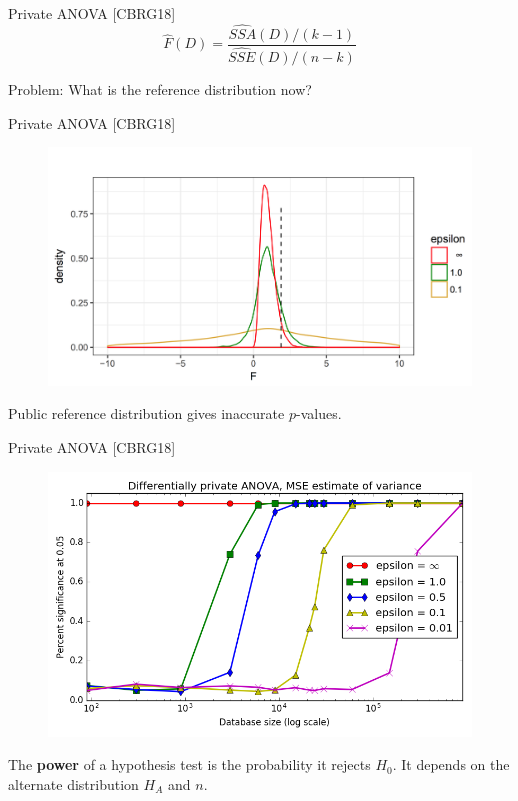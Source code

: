 \documentclass{beamer}
\newcommand{\sse}{\textit{SSE}\xspace}
\newcommand{\ssa}{\textit{SSA}\xspace}
\begin{document}
\begin{frame}{Private ANOVA [CBRG18]}
$$\widehat{F}(D) = \frac{\widehat{\ssa}(D)/(k-1)}{\widehat{\sse}(D)/(n-k)}$$
\bigskip

 \pause
 \centering
Problem: What is the reference distribution now?
\end{frame}


\begin{frame}{Private ANOVA [CBRG18]}
\begin{figure}
  \includegraphics[scale=0.3]{images/noisy-ref-dist}
\end{figure} 
\centering
Public reference distribution gives inaccurate $p$-values.
\end{frame}


\begin{frame}{Private ANOVA [CBRG18]}
  \begin{figure}
  \includegraphics[scale=0.45]{images/campbellpower}
  \end{figure}
  \begin{definition}[Power]
The \textbf{power} of a hypothesis test is the probability it rejects $H_0$.  It depends on the alternate distribution $H_A$ and $n$.
\end{definition}
\end{frame}
\end{document}
